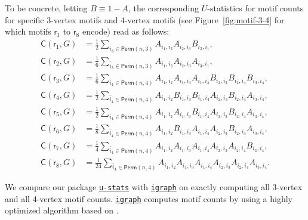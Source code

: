 \documentclass[twoside,11pt]{article}
\def\sfr{\mathsf{r}}
\newcommand{\libref}[2]{\href{#2}{\texttt{#1}}}
\newcommand{\perm}[1]{\mathsf{Perm}(#1)}
\newcommand{\completegraphp}[1]{K_{#1}}
\newcommand{\motifrg}[2]{\mathsf{C}(#1,#2)}
\newcommand{\less}{O}
\def\calA{\mathcal{A}}
\def\package{\libref{u-stats}{https://github.com/zrq1706/U-Statistics-python}}
\def\igraph{\libref{igraph}{https://igraph.org/}}
\begin{document}
To be concrete, letting $B \equiv 1 - A$, the corresponding $U$-statistics for motif counts for specific $3$-vertex motifs and $4$-vertex motifs (see Figure~\ref{fig:motif-3-4} for which motifs $\sfr_1$ to $\sfr_8$ encode) read as follows:
\begin{align*}
\motifrg{\sfr_1}{G} & = \frac{1}{2} \sum_{ \bar{i}_{3} \in \perm{n,3}}  A_{i_1, i_2} A_{i_2, i_3}  B_{i_3, i_1}, \\ \motifrg{\sfr_2}{G} & = \frac{1}{6} \sum_{ \bar{i}_{3} \in \perm{n,3}}  A_{i_1, i_2} A_{i_2, i_3} A_{i_3, i_1}, \\
\motifrg{\sfr_3}{G} & = \frac{1}{6} \sum_{ \bar{i}_{4} \in \perm{n,4}}  A_{i_1, i_2} A_{i_1, i_3} A_{i_1, i_4} B_{i_2, i_3} B_{i_2, i_4} B_{i_3, i_4}, \\ 
\motifrg{\sfr_4}{G} & = \frac{1}{2} \sum_{ \bar{i}_{4} \in \perm{n,4}}  A_{i_1, i_2} B_{i_1, i_3} B_{i_1, i_4} A_{i_2, i_3} B_{i_2, i_4} A_{i_3, i_4}, \\ 
\motifrg{\sfr_5}{G} & = \frac{1}{2} \sum_{ \bar{i}_{4} \in \perm{n,4}}  A_{i_1, i_2} A_{i_1, i_3} B_{i_1, i_4} A_{i_2, i_3} B_{i_2, i_4} A_{i_3, i_4}, \\ 
\motifrg{\sfr_6}{G} & = \frac{1}{8} \sum_{ \bar{i}_{4} \in \perm{n,4}}  A_{i_1, i_2} B_{i_1, i_3} A_{i_1, i_4} A_{i_2, i_3} B_{i_2, i_4} A_{i_3, i_4}, \\ 
\motifrg{\sfr_7}{G} & = \frac{1}{4} \sum_{ \bar{i}_{4} \in \perm{n,4}}  A_{i_1, i_2} A_{i_1, i_3} A_{i_1, i_4} A_{i_2, i_3} A_{i_2, i_4} B_{i_3, i_4}, \\ 
\motifrg{\sfr_8}{G} & = \frac{1}{24} \sum_{ \bar{i}_{4} \in \perm{n,4}}  A_{i_1, i_2} A_{i_1, i_3} A_{i_1, i_4} A_{i_2, i_3} A_{i_2, i_4} A_{i_3, i_4}.
\end{align*}


We compare our package \package{} with \igraph{} \citep{csardi2006igraph} on exactly computing all 3-vertex and all 4-vertex motif counts. \igraph{} computes motif counts by using a highly optimized algorithm based on \citet{wernicke2006fanmod}. 
\end{document}

